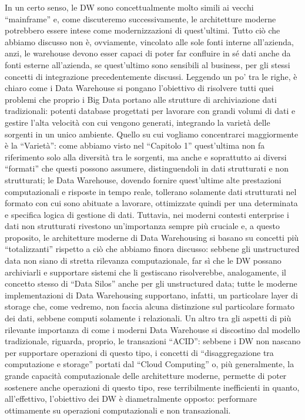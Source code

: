\documentclass[a4paper,12pt]{report}
\begin{document}
In un certo senso, le DW sono concettualmente molto simili ai vecchi “mainframe” e, come discuteremo successivamente, le architetture moderne potrebbero essere intese come modernizzazioni di quest’ultimi. Tutto ciò che abbiamo discusso non è, ovviamente, vincolato alle sole fonti interne all’azienda, anzi, le warehouse devono esser capaci di poter far confluire in sé dati anche da fonti esterne all’azienda, se quest’ultimo sono sensibili al business, per gli stessi concetti di integrazione precedentemente discussi. Leggendo un po’ tra le righe, è chiaro come i Data Warehouse si pongano l’obiettivo di risolvere tutti quei problemi che proprio i Big Data portano alle strutture di archiviazione dati tradizionali: potenti database progettati per lavorare con grandi volumi di dati e gestire l’alta velocità con cui vengono generati, integrando la varietà delle sorgenti in un unico ambiente. Quello su cui vogliamo concentrarci maggiormente è la “Varietà”: come abbiamo visto nel “Capitolo 1” quest’ultima non fa riferimento solo alla diversità tra le sorgenti, ma anche e soprattutto ai diversi “formati” che questi possono assumere, distinguendoli in dati strutturati e non strutturati; le Data Warehouse, dovendo fornire quest’ultime alte prestazioni computazionali e risposte in tempo reale, tollerano solamente dati strutturati nel formato con cui sono abituate a lavorare, ottimizzate quindi per una determinata e specifica logica di gestione di dati. Tuttavia, nei moderni contesti enterprise i dati non strutturati rivestono un’importanza sempre più cruciale e, a questo proposito, le architetture moderne di Data Warehousing si basano su concetti più “totalizzanti” rispetto a ciò che abbiamo finora discusso: sebbene gli unstructured data non siano di stretta rilevanza computazionale, far sì che le DW possano archiviarli e supportare sistemi che li gestiscano risolverebbe, analogamente, il concetto stesso di “Data Silos” anche per gli unstructured data; tutte le moderne implementazioni di Data Warehousing supportano, infatti, un particolare layer di storage che, come vedremo, non faccia alcuna distinzione sul particolare formato dei dati, sebbene computi solamente i relazionali. Un altro tra gli aspetti di più rilevante importanza di come i moderni Data Warehouse si discostino dal modello tradizionale, riguarda, proprio, le transazioni “ACID”: sebbene i DW non nascano per supportare operazioni di questo tipo, i concetti di “disaggregazione tra computazione e storage” portati dal “Cloud Computing” o, più generalmente, la grande capacità computazionale delle architetture moderne, permette di poter sostenere anche operazioni di questo tipo, rese terribilmente inefficienti in quanto, all’effettivo, l’obiettivo dei DW è diametralmente opposto: performare ottimamente su operazioni computazionali e non transazionali.
\end{document}
